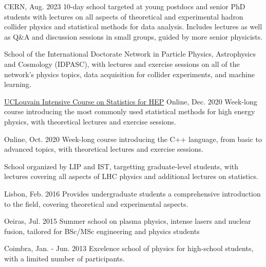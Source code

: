 
\begin{cventries}
    {}{CERN, Aug. 2023}
    {10-day school targeted at young postdocs and senior PhD students with lectures on all aspects of theoretical and experimental hadron collider physics and statistical methods for data analysis. Includes lectures as well as Q\&A and discussion sessions in small groups, guided by more senior physicists.}\vspace*{2mm}

    {School of the International Doctorate Network in Particle Physics, Astrophysics and Cosmology (IDPASC), with lectures and exercise sessions on all of the network's physics topics, data acquisition for collider experiments, and machine learning.}
    
    \cventry
    {\href{https://agenda.irmp.ucl.ac.be/event/4097/}{UCLouvain Intensive Course on Statistics for HEP}}{}
    {}{Online, Dec. 2020}
    {Week-long course introducing the most commonly used statistical methods for high energy physics, with theoretical lectures and exercise sessions.}\vspace*{2mm}
    
    {}{Online, Oct. 2020}
    {Week-long course introducing the C++ language, from basic to advanced topics, with theoretical lectures and exercise sessions.}\vspace*{2mm}
        
    {School organized by LIP and IST, targetting graduate-level students, with lectures covering all aspects of LHC physics and additional lectures on statistics.}

    {}{Lisbon, Feb. 2016}
    {Provides undergraduate students a comprehensive introduction to the field, covering theoretical and experimental aspects.}\vspace*{2mm}

    {}{Oeiras, Jul. 2015}
    {Summer school on plasma physics, intense lasers and nuclear fusion, tailored for BSc/MSc engineering and physics students}

    {}{Coimbra, Jan. - Jun. 2013}
    {Excelence school of physics for high-school students, with a limited number of participants.}

\end{cventries}

